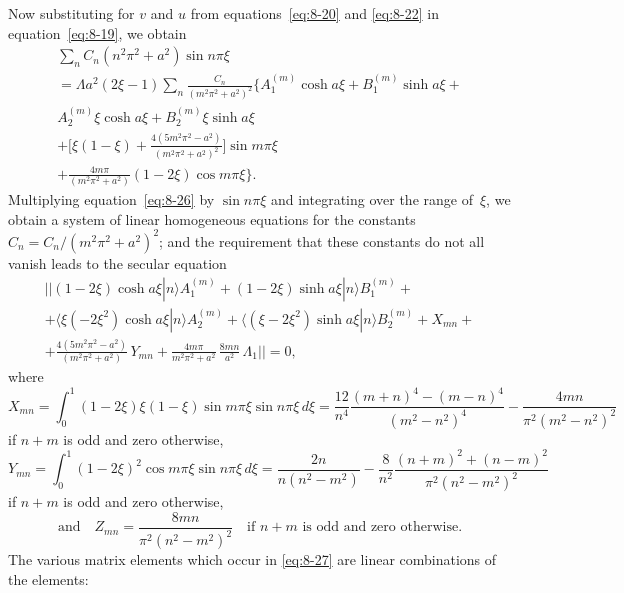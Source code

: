 Now substituting for $v$ and $u$ from equations~\eqref{eq:8-20} and \eqref{eq:8-22} in equation~\eqref{eq:8-19}, we obtain
\begin{multline}
\label{eq:8-26}
\sum_n C_n(n^2\pi^2 + a^2)\sin n\pi\xi \\
= \Lambda a^2(2\xi - 1)\sum_n \frac{C_n}{(m^2\pi^2 + a^2)^2}\biggl\{A_1^{(m)}\cosh a\xi + B_1^{(m)}\sinh a\xi + {} \\
A_2^{(m)}\xi\cosh a\xi + B_2^{(m)}\xi\sinh a\xi \\
+ \biggl[\xi(1-\xi) + \frac{4(5m^2\pi^2 - a^2)}{(m^2\pi^2 + a^2)^2}\biggr]\sin m\pi\xi \\
+ \frac{4m\pi}{(m^2\pi^2+a^2)}(1-2\xi)\cos m\pi\xi\biggr\}.
\end{multline}
Multiplying equation~\eqref{eq:8-26} by $\sin n\pi\xi$ and integrating over the range of~$\xi$, we obtain a system of linear homogeneous equations for the constants $C_n = C_n/(m^2\pi^2 + a^2)^2$; and the requirement that these constants do not all vanish leads to the secular equation
\begin{multline}
\label{eq:8-27}
\bigl|\bigl|(1-2\xi)\cosh a\xi|n\rangle A_1^{(m)} + (1-2\xi)\sinh a\xi|n\rangle B_1^{(m)} + {} \\
+ \langle\xi(- 2\xi^2)\cosh a\xi|n\rangle A_2^{(m)} + \langle(\xi-2\xi^2)\sinh a\xi|n\rangle B_2^{(m)} + X_{mn} + {} \\
+ \frac{4(5m^2\pi^2 - a^2)}{(m^2\pi^2+a^2)}\,Y_{mn} + \frac{4m\pi}{m^2\pi^2+a^2}\,\frac{8mn}{a^2}\,\Lambda_1\biggr|\biggr| = 0,
\end{multline}
where
\begin{equation}
\label{eq:8-28}
X_{mn} = \int_0^1 (1-2\xi)\xi(1-\xi)\sin m\pi\xi\sin n\pi\xi\,d\xi = \frac{12}{n^4}\frac{(m+n)^4 - (m-n)^4}{(m^2-n^2)^4} - \frac{4mn}{\pi^2(m^2-n^2)^2}
\end{equation}
if $n+m$ is odd and zero otherwise,
\begin{equation}
\label{eq:8-29}
Y_{mn} = \int_0^1 (1-2\xi)^2\cos m\pi\xi\sin n\pi\xi\,d\xi = \frac{2n}{n(n^2-m^2)} - \frac{8}{n^2}\frac{(n+m)^2 + (n-m)^2}{\pi^2(n^2-m^2)^2}
\end{equation}
if $n+m$ is odd and zero otherwise,
\begin{equation}
\label{eq:8-30}
\text{and}\quad Z_{mn} = \frac{8mn}{\pi^2(n^2-m^2)^2} \quad \text{if } n+m \text{ is odd and zero otherwise.}
\end{equation}
The various matrix elements which occur in \eqref{eq:8-27} are linear combinations of the elements:
